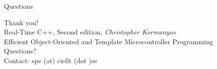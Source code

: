 \documentclass{beamer}
\begin{document}
\begin{frame}{Questions}
\begin{center}
  \Large Thank you! \normalsize\\
  \vspace{5mm}
  Real-Time C++, Second edition, \emph{Christopher Kormanyos} \\
  \tiny Efficient Object-Oriented and Template Microcontroller Programming \\
  \vspace{5mm}
  \normalsize Questions? \\
  \vspace{3mm}
  Contact: spe (at) ciellt (dot )se

\end{center}
\end{frame}


\end{document}
